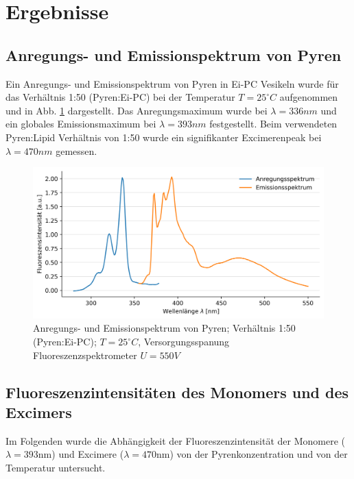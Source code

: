 \section{Ergebnisse}
\subsection{Anregungs- und Emissionspektrum von Pyren}
Ein Anregungs- und Emissionspektrum von Pyren in Ei-PC Vesikeln wurde für das Verhältnis 1:50 (Pyren:Ei-PC) bei der 
Temperatur $T=25^\circ C$ aufgenommen und in Abb. \ref{Em_Ex_Scan} dargestellt.
Das Anregungsmaximum wurde bei $\lambda=336nm$ und ein globales Emissionsmaximum bei $\lambda=393nm$ festgestellt. 
Beim verwendeten Pyren:Lipid Verhältnis von 1:50 wurde ein signifikanter Excimerenpeak bei $\lambda=470nm$ gemessen. 

\begin{figure}[h!]
	\begin{center}
		\begin{minipage}{0,8\textwidth}
			
			\includegraphics[width=\textwidth]{analysis/reports/Em_Ex_Scan_50.png}
			\caption{Anregungs- und Emissionspektrum von Pyren; Verhältnis 1:50 (Pyren:Ei-PC); $T=25^\circ C$, Versorgungsspanung Fluoreszenzspektrometer $U=550V$} 
			\label{Em_Ex_Scan} 
		\end{minipage}
	\end{center}
\end{figure}

\subsection{Fluoreszenzintensitäten des Monomers und des Excimers}
Im Folgenden wurde die Abhängigkeit der Fluoreszenzintensität der Monomere ($\lambda=393$nm) und 
Excimere ($\lambda=470$nm) von der Pyrenkonzentration und von der Temperatur untersucht.\\

